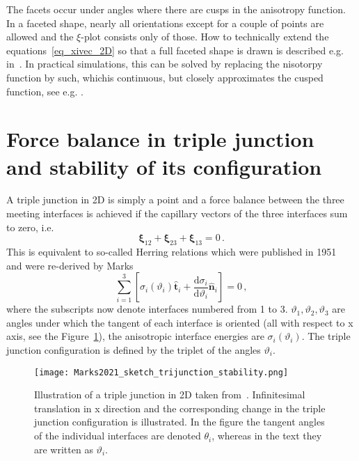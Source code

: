 The facets occur under angles where there are cusps in the anisotropy function. In a faceted shape, nearly all orientations except for a couple of points are allowed and the $\xi$-plot consists only of those. How to technically extend the equations~\eqref{eq_xivec_2D} so that a full faceted shape is drawn is described e.g. in~\cite{Kobayashi2001}. In practical simulations, this can be solved by replacing the nisotorpy function by such, whichis continuous, but closely approximates the cusped function, see e.g. \cite{Debierre2003}.

\section{Force balance in triple junction and stability of its configuration} \label{sec_intro_trijun_forcebalance_stability}
A triple junction in 2D is simply a point and a force balance between the three meeting interfaces is achieved if the capillary vectors of the three interfaces sum to zero, i.e.~\cite{Hoffman1972}
\begin{equation} \label{eq_trijun_forcebalance_sum_xivec}
    \bm{\xi}_{12}+\bm{\xi}_{23}+\bm{\xi}_{13}=0 \,.
\end{equation}
This is equivalent to so-called Herring relations which were published in 1951~\cite{Herring1999} and were re-derived by Marks~\cite{Marks2012}
\begin{equation} \label{eq_force_balance_3jun_aniso}
	\sum_{i=1}^3 \left[ \sigma_i(\vartheta_i)\hat{\bm{t}}_i +\frac{\mathrm{d} \sigma_i}{\mathrm{d} \vartheta_i}\hat{\bm{n}}_i \right] = 0 \,,
\end{equation}
where the subscripts now denote interfaces numbered from 1 to 3. $\vartheta_1,\vartheta_2,\vartheta_3$ are angles under which the tangent of each interface is oriented (all with respect to x axis, see the Figure~\ref{fig_Marks2012_sketch_trijun}), the anisotropic interface energies are $\sigma_i(\vartheta_i)$. The triple junction configuration is defined by the triplet of the angles $\vartheta_i$.
\begin{figure}
	\centering
	\texttt{[image: Marks2021\_sketch\_trijunction\_stability.png]}
	\caption{Illustration of a triple junction in 2D taken from~\cite{Marks2012}. Infinitesimal translation in x direction and the corresponding change in the triple junction configuration is illustrated. In the figure the tangent angles of  the individual interfaces are denoted $\theta_i$, whereas in the text they are written as $\vartheta_i$.}
	\label{fig_Marks2012_sketch_trijun}
\end{figure}
